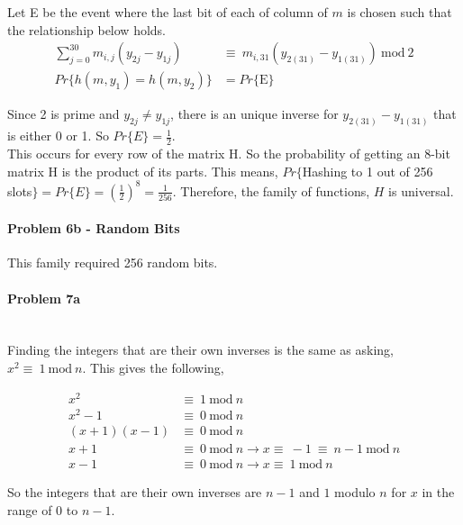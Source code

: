 \documentclass[fleqn]{article}
\begin{document}
\noindent
Let E be the event where the last bit of each of column of $m$ is chosen such that the relationship below holds.
\begin{align*}
\sum\limits_{j=0}^{30} m_{i,j}\left(y_{2j} - y_{1j}\right)\ &\equiv\ m_{i,31}(y_{2(31)} - y_{1(31)})\ \textrm{mod}\ 2\\
Pr\{h(m, y_1) = h(m, y_2)\} &= Pr\{\textrm{E\}}
\end{align*}

\noindent
Since 2 is prime and $y_{2j} \neq y_{1j}$, there is an unique inverse for $y_{2(31)} - y_{1(31)}$ that is either 0 or 1.  So $Pr\{E\}= \frac{1}{2}$.\\

\noindent
This occurs for every row of the matrix H.  So the probability of getting an 8-bit matrix H is the product of its parts.  This means, $Pr\{$Hashing to 1 out of 256 slots$\}=Pr\{E\}=(\frac{1}{2})^{8}=\frac{1}{256}$.  Therefore, the family of functions, $H$ is universal.

\paragraph{Problem 6b - Random Bits}
This family required 256 random bits.

\pagebreak
\paragraph{Problem 7a} ~\\
Finding the integers that are their own inverses is the same as asking, $x^2 \equiv\ 1\ \textrm{mod}\ n$.  This gives the following,

\begin{align*}
x^2 &\equiv\ 1\ \textrm{mod}\ n\\
x^2 - 1 &\equiv\ 0\ \textrm{mod}\ n\\
(x+1)(x-1) &\equiv\ 0\ \textrm{mod}\ n\\
x+1 &\equiv\ 0\ \textrm{mod}\ n \rightarrow x \equiv\ -1\ \equiv\ n-1\ \textrm{mod}\ n\\
x-1 &\equiv\ 0\ \textrm{mod}\ n \rightarrow x \equiv\ 1\ \textrm{mod}\ n
\end{align*}

So the integers that are their own inverses are $n-1$ and $1$ modulo $n$ for $x$ in the range of $0$ to $n-1$.
\end{document}
